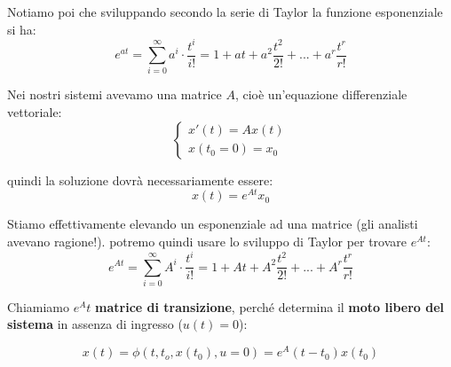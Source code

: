 \documentclass[a4paper,11pt]{article}
\begin{document}
Notiamo poi che sviluppando secondo la serie di Taylor la funzione esponenziale si ha:
$$
e^{at} = \sum_{i = 0}^\infty a^i \cdot \frac{t^i}{i!} = 1 + at + a^2 \frac{t^2}{2!} + ... + a^r \frac{t^r}{r!}
$$

Nei nostri sistemi avevamo una matrice $A$, cioè un'equazione differenziale vettoriale:
\[
	\begin{cases}			
		x'(t) = Ax(t) \\ 
		x(t_0 = 0) = x_0
	\end{cases}
\]

quindi la soluzione dovrà necessariamente essere:
$$
x(t) = e^{At} x_0
$$

Stiamo effettivamente elevando un esponenziale ad una matrice (gli analisti avevano ragione!).
potremo quindi usare lo sviluppo di Taylor per trovare $e^{At}$:
$$
e^{At} = \sum_{i = 0}^\infty A^i \cdot \frac{t^i}{i!} = 1 + At + A^2 \frac{t^2}{2!} + ... + A^r \frac{t^r}{r!}
$$

Chiamiamo $e^At$ \textbf{matrice di transizione}, perché determina il \textbf{moto libero del sistema} in assenza di ingresso ($u(t) = 0$):

$$
x(t) = \phi(t, t_o, x(t_0), u = 0) = e^A(t- t_0)x(t_0)
$$
\end{document}
